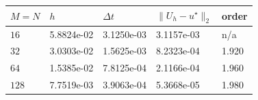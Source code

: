 \begin{tabular}{lllll}
\toprule
$M=N$ & $h$ & $\Delta t$ & $\|U_h-u^\star\|_2$ & order \\
\midrule
$16$ & 5.8824e-02 & 3.1250e-03 & 3.1157e-03 & n/a \\
$32$ & 3.0303e-02 & 1.5625e-03 & 8.2323e-04 & 1.920 \\
$64$ & 1.5385e-02 & 7.8125e-04 & 2.1166e-04 & 1.960 \\
$128$ & 7.7519e-03 & 3.9063e-04 & 5.3668e-05 & 1.980 \\
\bottomrule
\end{tabular}
